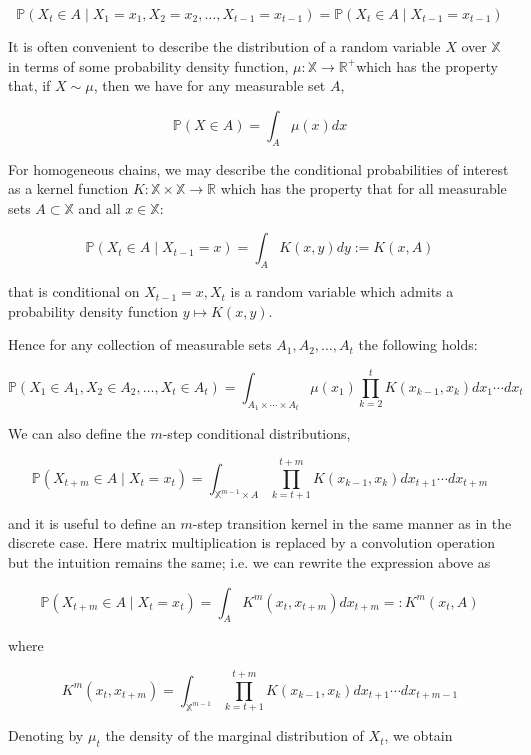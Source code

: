 \documentclass[10pt]{article}
\begin{document}
$$
\mathbb{P}\left(X_{t} \in A \mid X_{1}=x_{1}, X_{2}=x_{2}, \ldots, X_{t-1}=x_{t-1}\right)=\mathbb{P}\left(X_{t} \in A \mid X_{t-1}=x_{t-1}\right)
$$

It is often convenient to describe the distribution of a random variable $X$ over $\mathbb{X}$ in terms of some probability density function, $\mu: \mathbb{X} \rightarrow \mathbb{R}^{+}$which has the property that, if $X \sim \mu$, then we have for any measurable set $A$,

$$
\mathbb{P}(X \in A)=\int_{A} \mu(x) d x
$$

For homogeneous chains, we may describe the conditional probabilities of interest as a kernel function $K: \mathbb{X} \times \mathbb{X} \rightarrow \mathbb{R}$ which has the property that for all measurable sets $A \subset \mathbb{X}$ and all $x \in \mathbb{X}:$

$$
\mathbb{P}\left(X_{t} \in A \mid X_{t-1}=x\right)=\int_{A} K(x, y) d y:=K(x, A)
$$

that is conditional on $X_{t-1}=x, X_{t}$ is a random variable which admits a probability density function $y \mapsto K(x, y)$.

Hence for any collection of measurable sets $A_{1}, A_{2}, \ldots, A_{t}$ the following holds:

$$
\mathbb{P}\left(X_{1} \in A_{1}, X_{2} \in A_{2}, \ldots, X_{t} \in A_{t}\right)=\int_{A_{1} \times \cdots \times A_{t}} \mu\left(x_{1}\right) \prod_{k=2}^{t} K\left(x_{k-1}, x_{k}\right) d x_{1} \cdots d x_{t}
$$

We can also define the $m$-step conditional distributions,

$$
\mathbb{P}\left(X_{t+m} \in A \mid X_{t}=x_{t}\right)=\int_{\mathbb{X}^{m-1} \times A} \prod_{k=t+1}^{t+m} K\left(x_{k-1}, x_{k}\right) d x_{t+1} \cdots d x_{t+m}
$$

and it is useful to define an $m$-step transition kernel in the same manner as in the discrete case. Here matrix multiplication is replaced by a convolution operation but the intuition remains the same; i.e. we can rewrite the expression above as

$$
\mathbb{P}\left(X_{t+m} \in A \mid X_{t}=x_{t}\right)=\int_{A} K^{m}\left(x_{t}, x_{t+m}\right) d x_{t+m}=: K^{m}\left(x_{t}, A\right)
$$

where

$$
K^{m}\left(x_{t}, x_{t+m}\right)=\int_{\mathbb{X}^{m-1}} \prod_{k=t+1}^{t+m} K\left(x_{k-1}, x_{k}\right) d x_{t+1} \cdots d x_{t+m-1}
$$

Denoting by $\mu_{t}$ the density of the marginal distribution of $X_{t}$, we obtain
\end{document}
